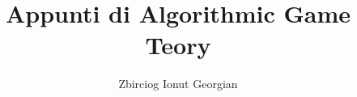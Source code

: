 \documentclass[a4paper,12pt]{report}
\begin{document}
\title{Appunti di Algorithmic Game Teory}
\author{Zbirciog Ionut Georgian}
\maketitle
 
\setcounter{tocdepth}{3}
\setcounter{secnumdepth}{3}
\tableofcontents


\end{document}
